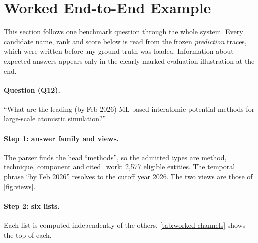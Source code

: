 \documentclass[11pt,a4paper]{article}
\newcommand{\cref}[1]{\autoref{#1}}
\newcommand{\Cref}[1]{\autoref{#1}}
\theoremstyle{remark}
\begin{document}
\section{Worked End-to-End Example}
\label{sec:worked}

This section follows one benchmark question through the whole system. Every candidate
name, rank and score below is read from the frozen \emph{prediction} traces, which were
written before any ground truth was loaded. Information about expected answers appears
only in the clearly marked evaluation illustration at the end.

\paragraph{Question (Q12).} ``What are the leading (by Feb 2026) ML-based interatomic
potential methods for large-scale atomistic simulation?''

\paragraph{Step 1: answer family and views.} The parser finds the head ``methods'', so
the admitted types are method, technique, component and cited\_work: 2{,}577 eligible
entities. The temporal phrase ``by Feb 2026'' resolves to the cutoff year 2026. The two
views are those of \cref{fig:views}.

\paragraph{Step 2: six lists.} Each list is computed independently of the others.
\Cref{tab:worked-channels} shows the top of each.
\end{document}
